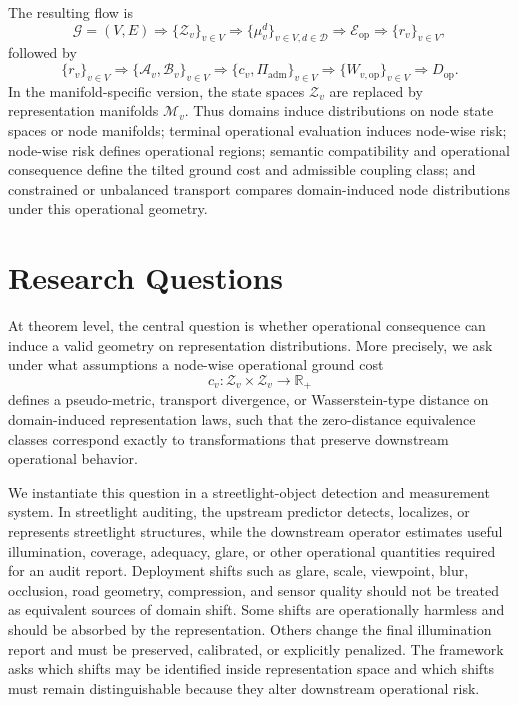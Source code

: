 \documentclass[10pt,twocolumn]{article}
\begin{document}
The resulting flow is
\[
\mathcal{G}=(V,E)
\Rightarrow
\{\mathcal{Z}_v\}_{v\in V}
\Rightarrow
\{\mu_v^d\}_{v\in V,d\in\mathcal{D}}
\Rightarrow
\mathcal{E}_{\mathrm{op}}
\Rightarrow
\{r_v\}_{v\in V},
\]
followed by
\[
\{r_v\}_{v\in V}
\Rightarrow
\{\mathcal{A}_v,\mathcal{B}_v\}_{v\in V}
\Rightarrow
\{c_v,\Pi_{\mathrm{adm}}\}_{v\in V}
\Rightarrow
\{W_{v,\mathrm{op}}\}_{v\in V}
\Rightarrow
D_{\mathrm{op}}.
\]
In the manifold-specific version, the state spaces $\mathcal{Z}_v$ are replaced by representation manifolds $\mathcal{M}_v$. Thus domains induce distributions on node state spaces or node manifolds; terminal operational evaluation induces node-wise risk; node-wise risk defines operational regions; semantic compatibility and operational consequence define the tilted ground cost and admissible coupling class; and constrained or unbalanced transport compares domain-induced node distributions under this operational geometry.

\section{Research Questions}

At theorem level, the central question is whether operational consequence can induce a valid geometry on representation distributions. More precisely, we ask under what assumptions a node-wise operational ground cost
\[
c_v:\mathcal{Z}_v\times\mathcal{Z}_v\rightarrow\mathbb{R}_{+}
\]
defines a pseudo-metric, transport divergence, or Wasserstein-type distance on domain-induced representation laws, such that the zero-distance equivalence classes correspond exactly to transformations that preserve downstream operational behavior.

We instantiate this question in a streetlight-object detection and measurement system. In streetlight auditing, the upstream predictor detects, localizes, or represents streetlight structures, while the downstream operator estimates useful illumination, coverage, adequacy, glare, or other operational quantities required for an audit report. Deployment shifts such as glare, scale, viewpoint, blur, occlusion, road geometry, compression, and sensor quality should not be treated as equivalent sources of domain shift. Some shifts are operationally harmless and should be absorbed by the representation. Others change the final illumination report and must be preserved, calibrated, or explicitly penalized. The framework asks which shifts may be identified inside representation space and which shifts must remain distinguishable because they alter downstream operational risk.
\end{document}
